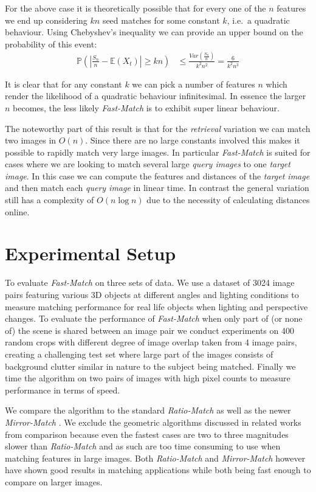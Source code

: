 \documentclass[10pt,twocolumn,letterpaper]{article}
\begin{document}
For the above case it is theoretically possible that for every one of the $n$ features we end up considering $kn$ seed matches for some constant $k$, i.e.\ a quadratic behaviour. Using Chebyshev's inequality we can provide an upper bound on the probability of this event:
\begin{align}
    \label{bound}
    \mathbb{P}\left(\left| \frac{S_n}{n} - \mathbb{E}(X_t) \right| \ge kn\right) &\le \frac{Var\left(\frac{S_n}{n}\right)}{k^2n^2} = \frac{6}{k^2n^3}
\end{align}

It is clear that for any constant $k$ we can pick a number of features $n$ which render the likelihood of a quadratic behaviour infinitesimal. In essence the larger $n$ becomes, the less likely \emph{Fast-Match} is to exhibit super linear behaviour.

The noteworthy part of this result is that for the \emph{retrieval} variation we can match two images in $O(n)$. Since there are no large constants involved this makes it possible to rapidly match very large images. In particular \emph{Fast-Match} is suited for cases where we are looking to match several large \emph{query images} to one \emph{target image}. In this case we can compute the features and distances of the \emph{target image} and then match each \emph{query image} in linear time. In contrast the general variation still has a complexity of $O(n \log n)$ due to the necessity of calculating distances online.

\section{Experimental Setup}
\label{experiments}
%
To evaluate \emph{Fast-Match} on three sets of data. We use a dataset of 3024 image pairs featuring various 3D objects at different angles and lighting conditions to measure matching performance for real life objects when lighting and perspective changes. To evaluate the performance of \emph{Fast-Match} when only part of (or none of) the scene is shared between an image pair we conduct experiments on 400 random crops with different degree of image overlap taken from 4 image pairs, creating a challenging test set where large part of the images consists of background clutter similar in nature to the subject being matched. Finally we time the algorithm on two pairs of images with high pixel counts to measure performance in terms of speed. 

We compare the algorithm to the standard \emph{Ratio-Match} \cite{lowe2004sift} as well as the newer \emph{Mirror-Match} \cite{arnfred2013mirror}. We exclude the geometric algorithms discussed in related works from comparison because even the fastest cases are two to three magnitudes slower than \emph{Ratio-Match} and as such are too time consuming to use when matching features in large images. Both \emph{Ratio-Match} and \emph{Mirror-Match} however have shown good results in matching applications while both being fast enough to compare on larger images. 
\end{document}
